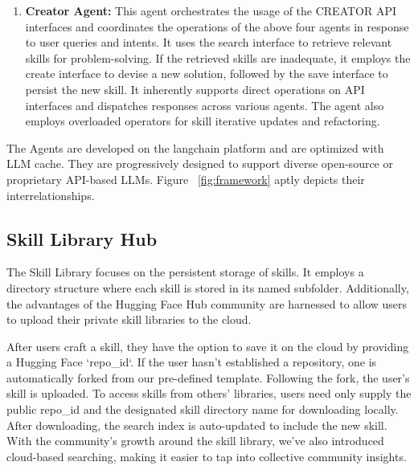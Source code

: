 \begin{enumerate}
    \item \textbf{Creator Agent:} This agent orchestrates the usage of the CREATOR API interfaces and coordinates the operations of the above four agents in response to user queries and intents. It uses the search interface to retrieve relevant skills for problem-solving. If the retrieved skills are inadequate, it employs the create interface to devise a new solution, followed by the save interface to persist the new skill. It inherently supports direct operations on API interfaces and dispatches responses across various agents. The agent also employs overloaded operators for skill iterative updates and refactoring.
\end{enumerate}

The Agents are developed on the langchain platform and are optimized with LLM cache. They are progressively designed to support diverse open-source or proprietary API-based LLMs.  Figure ~\ref{fig:framework} aptly depicts their interrelationships.

\subsection{Skill Library Hub}

The Skill Library focuses on the persistent storage of skills. It employs a directory structure where each skill is stored in its named subfolder. Additionally, the advantages of the Hugging Face Hub community are harnessed to allow users to upload their private skill libraries to the cloud.

After users craft a skill, they have the option to save it on the cloud by providing a Hugging Face `repo\_id`. If the user hasn't established a repository, one is automatically forked from our pre-defined template. Following the fork, the user's skill is uploaded. To access skills from others' libraries, users need only supply the public repo\_id and the designated skill directory name for downloading locally. After downloading, the search index is auto-updated to include the new skill. With the community's growth around the skill library, we've also introduced cloud-based searching, making it easier to tap into collective community insights.